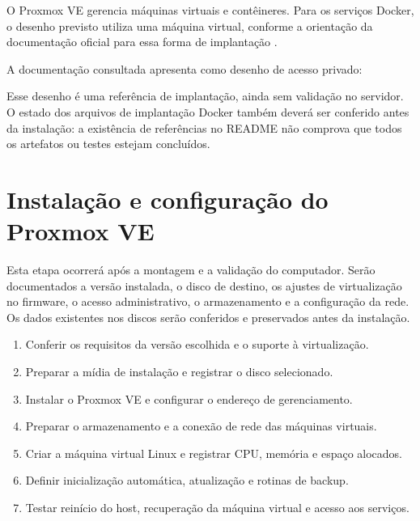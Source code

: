 \documentclass[11pt,a4paper,oneside]{report}
\begin{document}
O Proxmox VE gerencia máquinas virtuais e contêineres. Para os serviços Docker,
o desenho previsto utiliza uma máquina virtual, conforme a orientação da
documentação oficial para essa forma de implantação \cite{proxmox}.

\begin{center}
\end{center}

A documentação consultada apresenta como desenho de acesso privado:
\begin{center}
\end{center}
Esse desenho é uma referência de implantação, ainda sem validação no servidor.
O estado dos arquivos de implantação Docker também deverá ser conferido antes
da instalação: a existência de referências no README não comprova que todos
os artefatos ou testes estejam concluídos.

\section{Instalação e configuração do Proxmox VE}
Esta etapa ocorrerá após a montagem e a validação do computador. Serão
documentados a versão instalada, o disco de destino, os ajustes de virtualização
no firmware, o acesso administrativo, o armazenamento e a configuração da rede.
Os dados existentes nos discos serão conferidos e preservados antes da instalação.

\begin{enumerate}
\item Conferir os requisitos da versão escolhida e o suporte à virtualização.
\item Preparar a mídia de instalação e registrar o disco selecionado.
\item Instalar o Proxmox VE e configurar o endereço de gerenciamento.
\item Preparar o armazenamento e a conexão de rede das máquinas virtuais.
\item Criar a máquina virtual Linux e registrar CPU, memória e espaço alocados.
\item Definir inicialização automática, atualização e rotinas de backup.
\item Testar reinício do host, recuperação da máquina virtual e acesso aos serviços.
\end{enumerate}
\end{document}
